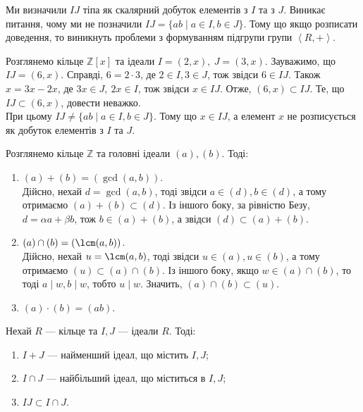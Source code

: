 \documentclass{math_library}
\begin{document}
\begin{remark}
Ми визначили $IJ$ тіпа як скалярний добуток елементів з $I$ та з $J$. Виникає питання, чому ми не позначили $IJ = \{ab \mid a \in I, b \in J\}$. Тому що якщо розписати доведення, то виникнуть проблеми з формуванням підгрупи групи $\left<R,+\right>$.
\end{remark}

\begin{example}
Розглянемо кільце $\mathbb{Z}[x]$ та ідеали $I = (2,x),\ J = (3,x)$. Зауважимо, що $IJ = (6,x)$. Справді, $6 = 2 \cdot 3$, де $2 \in I, 3 \in J$, тож звідси $6 \in IJ$. Також $x = 3x - 2x$, де $3x \in J,\ 2x \in I$, тож звідси $x \in IJ$. Отже, $(6,x) \subset IJ$. Те, що $IJ \subset (6,x)$, довести неважко.\\
При цьому $IJ \neq \{ ab \mid a \in I, b \in J \}$. Тому що $x \in IJ$, а елемент $x$ не розписується як добуток елементів з $I$ та $J$.
\end{example}

\begin{example}
Розглянемо кільце $\mathbb{Z}$ та головні ідеали $(a),(b)$. Тоді:
\begin{enumerate}[wide=0pt,label={\Roman*.}]
\item $(a) + (b) = (\gcd(a,b))$.\\
Дійсно, нехай $d = \gcd(a,b)$, тоді звідси $a \in (d), b \in (d)$, а тому отримаємо $(a)+(b) \subset (d)$. Із іншого боку, за рівністю Безу, $d = \alpha a + \beta b$, тож $b \in (a) + (b)$, а звідси $(d) \subset (a) + (b)$.

\item $(a) \cap (b) = (\lcm(a,b))$.\\
Дійсно, нехай $u = \lcm(a,b)$, тоді звідси $u \in (a), u \in (b)$, а тому отримаємо $(u) \subset (a) \cap (b)$. Із іншого боку, якщо $w \in (a) \cap (b)$, то тоді $a \mid w, b \mid w$, тобто $u \mid w$. Значить, $(a) \cap (b) \subset (u)$.

\item $(a) \cdot (b) = (ab)$.
\end{enumerate}
\end{example}

\begin{proposition}
Нехай $R$ --- кільце та $I,J$ --- ідеали $R$. Тоді:
\begin{enumerate}[nosep,wide=0pt,label={\arabic*)}]
\item $I+J$ --- найменший ідеал, що містить $I,J$;
\item $I \cap J$ --- найбільший ідеал, що міститься в $I,J$;
\item $IJ \subset I \cap J$.
\end{enumerate}
\end{proposition}
\end{document}
